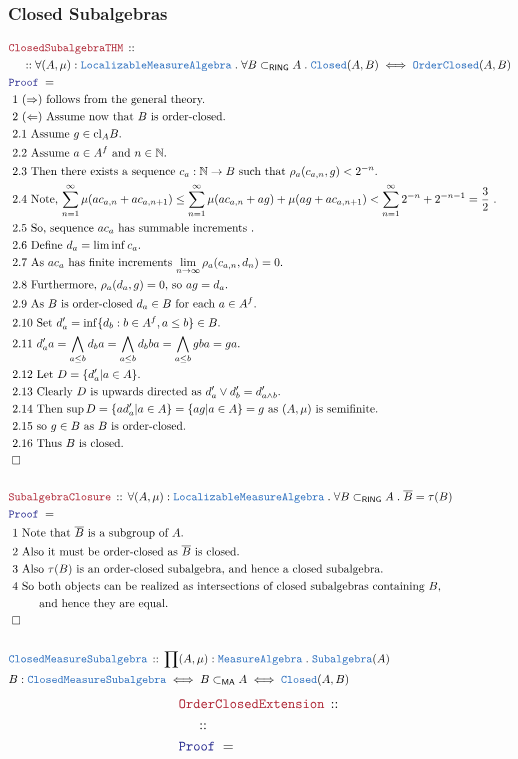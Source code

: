 \documentclass[12pt]{scrartcl}
\newcommand{\TYPE}[1]{\textcolor{NavyBlue}{\mathtt{#1}}}
\newcommand{\LOGIC}[1]{\textcolor{Blue}{\mathtt{#1}}}
\newcommand{\THM}[1]{\textcolor{Maroon}{\mathtt{#1}}}
\renewcommand{\.}{\; . \;}
\newcommand{\Theorem}[2]{& \THM{#1} \, :: \, #2 \\ & \Proof = \\ }
\newcommand{\DeclareType}[2]{& \TYPE{#1} \, :: \, #2 \\}
\newcommand{\DefineNamedType}[4]{& #1 : \TYPE{#2} \iff #3 \iff #4 \\}
\newcommand{\NewLine}{\\ & \kern 1pc}
\newcommand{\Page}[1]{ \begin{align*} #1 \end{align*}   }
\newcommand{\Nat}{\mathbb{N} }
\newcommand{\QED}{\; \square}
\newcommand{\EndProof}{& \QED \\}
\newcommand{\Proof}{\LOGIC{Proof} \; }
\newcommand{\Explain}[1]{& \text{#1.} \\}
\newcommand{\ExplainFurther}[1]{& \text{#1} \\}
\newcommand{\OC}{\TYPE{OrderClosed}}
\newcommand{\Closed}{\TYPE{Closed}}
\DeclareMathOperator*{\cl}{cl}
\newcommand{\Loc}{\TYPE{Localizable}}
\newcommand{\MA}{\TYPE{MeasureAlgebra}}
\newcommand{\ma}{\mathsf{MA}}
\begin{document}
\subsubsection{Closed Subalgebras}
\Page{
	\Theorem{ClosedSubalgebraTHM}
	{
		\NewLine ::		
		\forall (A,\mu) : \Loc\MA \.
		\forall B \subset_{\mathsf{RING}} A \.
		\Closed(A,B) \iff \OC(A,B) 
	}
	\Explain{ 1 $(\Rightarrow)$ follows from the general theory}
	\Explain{ 2 $(\Leftarrow)$ Assume now that $B$ is order-closed}
	\Explain{ 2.1 Assume $g \in {\cl}_A B$}
	\Explain{ 2.2 Assume $a \in A^f$ and $n \in \Nat$} 
	\Explain{ 2.3 Then there exists a sequence $c_a : \Nat \to B$ 
		such that $\rho_a(c_{a,n},g) < 2^{-n}$}
	\Explain{ 2.4 Note, $\sum^\infty_{n=1} \mu(ac_{a,n} + ac_{a,n + 1}) 
		\le \sum^\infty_{n=1} \mu(ac_{a,n} +ag) + \mu(ag + ac_{a,n + 1}) < 
		 \sum^\infty_{n=1} 2^{-n} + 2^{-n-1} = \frac{3}{2} $ }
	\Explain{ 2.5 So, sequence $ac_a$ has summable increments  }
	\Explain{ 2.6 Define $d_a = \liminf c_{a}$}
	\Explain{ 2.7 As $ac_a$ has finite increments $\lim_{n \to \infty} \rho_a(c_{a,n},d_n) = 0$}
	\Explain{ 2.8 Furthermore, $\rho_a(d_a,g) = 0$, so $ag = d_a$}
	\Explain{ 2.9 As $B$ is order-closed $d_a \in B$ for each $a \in A^f$}
	\Explain{ 2.10 Set $d'_a = \inf \{ d_b : b \in A^f, a \le b  \} \in B$}
	\Explain{ 2.11  $d'_a a  = \bigwedge_{a \le b} d_b a = \bigwedge_{a \le b} d_b b a  = 
		  \bigwedge_{a \le b}  g b a = g a$}
	\Explain{ 2.12 Let $D = \{ d_a' | a \in A \} $}
	\Explain{ 2.13 Clearly $D$ is upwards directed as $d'_a \vee d'_b = d'_{a \wedge b}$}
	\Explain{ 2.14 Then  $\sup D = \{ ad_a' | a \in A \} = \{ ag | a \in A \} = g$
		as $(A,\mu)$ is semifinite}
	\Explain{ 2.15 so $g \in B$ as $B$ is order-closed}
	\Explain{ 2.16 Thus $B$ is closed}
	\EndProof
	\\
	\Theorem{SubalgebraClosure}
	{
		\forall (A,\mu) : \Loc\MA \.
		\forall B \subset_{\mathsf{RING}} A \.
		\overline{B} =  \tau(B)
	}
	\Explain{ 1 Note that $\overline{B}$ is a subgroup of $A$}
	\Explain{ 2 Also it must be order-closed as $\overline{B}$ is closed}
	\Explain{ 3 Also $\tau(B)$ is an order-closed subalgebra, and hence a closed subalgebra}
	\ExplainFurther{ 4 So both objects can be realized as intersections 
		of closed subalgebras containing $B$,}
	\Explain{ $\quad\quad$	and hence they are equal}
	\EndProof      
	\\
	\DeclareType{ClosedMeasureSubalgebra}{\prod (A,\mu) : \MA \. \TYPE{Subalgebra}(A)}
	\DefineNamedType{B}{ClosedMeasureSubalgebra}{B \subset_{\ma} A}
	{\Closed(A,B)}
}\Page{
	\Theorem{OrderClosedExtension}
	{
		\NewLine ::		
}}
\end{document}
